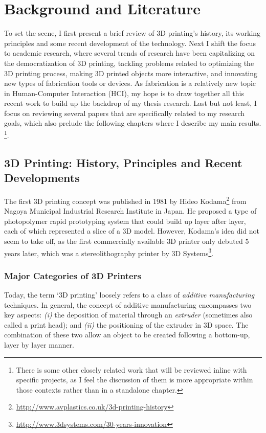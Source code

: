 \chapter{Background and Literature}
To set the scene, I first present a brief review of 3D printing's history, its working principles and some recent development of the technology. Next I shift the focus to academic research, where several trends of research have been capitalizing on the democratization of 3D printing, tackling problems related to optimizing the 3D printing process, making 3D printed objects more interactive, and innovating new types of fabrication tools or devices. As fabrication is a relatively new topic in Human-Computer Interaction (HCI), my hope is to draw together all this recent work to build up the backdrop of my thesis research. Last but not least, I focus on reviewing several papers that are specifically related to my research goals, which also prelude the following chapters where I describe my main results. \footnote{There is some other closely related work that will be reviewed inline with specific projects, as I feel the discussion of them is more appropriate within those contexts rather than in a standalone chapter.}.

\section{3D Printing: History, Principles and Recent Developments}
The first 3D printing concept was published in 1981 by Hideo Kodama\footnote{\url{http://www.avplastics.co.uk/3d-printing-history}} from Nagoya Municipal Industrial Research Institute in Japan. He proposed a type of photopolymer rapid prototyping system that could build up layer after layer, each of which represented a slice of a 3D model. However, Kodama's idea did not seem to take off, as the first commercially available 3D printer only debuted 5 years later, which was a stereolithography printer by 3D Systems\footnote{\url{http://www.3dsystems.com/30-years-innovation}}.

\subsection{Major Categories of 3D Printers}
Today, the term `3D printing' loosely refers to a class of \textit{additive manufacturing} techniques\cite{gibson2010additive}. In general, the concept of additive manufacturing encompasses two key aspects: {\em (i)} the deposition of material through an \textit{extruder} (sometimes also called a print head); and {\em (ii)} the positioning of the extruder in 3D space. The combination of these two allow an object to be created following a bottom-up, layer by layer manner.

